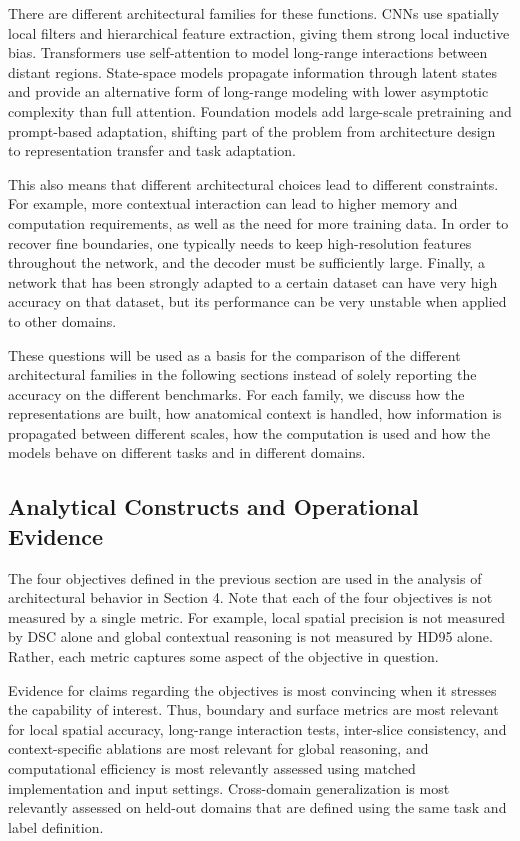 \documentclass[5p,times,authoryear]{elsarticle}
\begin{document}
There are different architectural families for these functions. CNNs use spatially local filters and hierarchical feature extraction, giving them strong local inductive bias. Transformers use self-attention to model long-range interactions between distant regions. State-space models propagate information through latent states and provide an alternative form of long-range modeling with lower asymptotic complexity than full attention. Foundation models add large-scale pretraining and prompt-based adaptation, shifting part of the problem from architecture design to representation transfer and task adaptation.

This also means that different architectural choices lead to different constraints. For example, more contextual interaction can lead to higher memory and computation requirements, as well as the need for more training data. In order to recover fine boundaries, one typically needs to keep high-resolution features throughout the network, and the decoder must be sufficiently large. Finally, a network that has been strongly adapted to a certain dataset can have very high accuracy on that dataset, but its performance can be very unstable when applied to other domains.

These questions will be used as a basis for the comparison of the different architectural families in the following sections instead of solely reporting the accuracy on the different benchmarks. For each family, we discuss how the representations are built, how anatomical context is handled, how information is propagated between different scales, how the computation is used and how the models behave on different tasks and in different domains.
\subsection{Analytical Constructs and Operational Evidence}
\label{subsec:constructs}

The four objectives defined in the previous section are used in the analysis of architectural behavior in Section 4. Note that each of the four objectives is not measured by a single metric. For example, local spatial precision is not measured by DSC alone and global contextual reasoning is not measured by HD95 alone. Rather, each metric captures some aspect of the objective in question.

Evidence for claims regarding the objectives is most convincing when it stresses the capability of interest. Thus, boundary and surface metrics are most relevant for local spatial accuracy, long-range interaction tests, inter-slice consistency, and context-specific ablations are most relevant for global reasoning, and computational efficiency is most relevantly assessed using matched implementation and input settings. Cross-domain generalization is most relevantly assessed on held-out domains that are defined using the same task and label definition.
\end{document}
